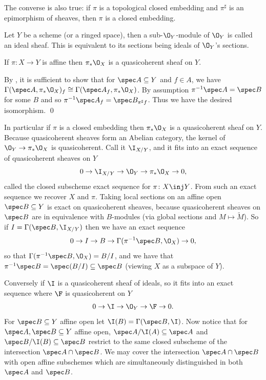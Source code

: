     The converse is also true: if $\pi$ is a topological closed embedding and $\pi^\sharp$ is an epimorphism of sheaves, then $\pi$ is a closed
    embedding.

\eremark

\bdefn

    Let $Y$ be a scheme (or a ringed space), then a sub-$\O_Y$-module of $\O_Y$ is called an {\emphcolor ideal sheaf}.
    This is equivalent to its sections being ideals of $\O_Y$'s sections.

\edefn

\blemm

    If $\pi\colon X\to Y$ is affine then $\pi_*\O_X$ is a quasicoherent sheaf on $Y$.

\elemm

\bproof

    By , it is sufficient to show that for $\spec A\subseteq Y$ and $f\in A$,
    we have $\Gamma(\spec A,\pi_*\O_X)_f\cong\Gamma(\spec A_f,\pi_*\O_X)$.
    By assumption $\pi^{-1}\spec A=\spec B$ for some $B$ and so $\pi^{-1}\spec A_f=\spec B_{\pi^\sharp f}$.
    Thus we have the desired isomorphism.
    \qed

\eproof

In particular if $\pi$ is a closed embedding then $\pi_*\O_X$ is a quasicoherent sheaf on $Y$.
Because quasicoherent sheaves form an Abelian category, the kernel of $\O_Y\to\pi_*\O_X$ is quasicoherent.
Call it $\I_{X/Y}$, and it fits into an exact sequence of quasicoherent sheaves on $Y$
$$ 0 \to \I_{X/Y} \to \O_Y \to \pi_*\O_X \to 0 , $$
called the {\emphcolor closed subscheme exact sequence} for $\pi\colon X\inj Y$.
From such an exact sequence we recover $X$ and $\pi$.
Taking local sections on an affine open $\spec B\subseteq Y$ is exact on quasicoherent sheaves, because quasicoherent sheaves on $\spec B$
are in equivalence with $B$-modules (via global sections and $M\mapsto\tilde M$).
So if $I=\Gamma(\spec B,\I_{X/Y})$ then we have an exact sequence
$$ 0 \to I \to B \to \Gamma(\pi^{-1}\spec B,\O_X) \to 0 , $$
so that $\Gamma(\pi^{-1}\spec B,\O_X)=B/I$, and we have that $\pi^{-1}\spec B=\spec(B/I)\subseteq\spec B$ (viewing $X$ as a subspace of $Y$).

Conversely if $\I$ is a quasicoherent sheaf of ideals, so it fits into an exact sequence where $\F$ is quasicoherent on $Y$
$$ 0 \to \I \to \O_Y \to \F \to 0 . $$
For $\spec B\subseteq Y$ affine open let $\I(B)=\Gamma(\spec B,\I)$.
Now notice that for $\spec A,\spec B\subseteq Y$ affine open, $\spec A/\I(A)\subseteq\spec A$ and $\spec B/\I(B)\subseteq\spec B$
restrict to the same closed subscheme of the intersection $\spec A\cap\spec B$.
We may cover the intersection $\spec A\cap\spec B$ with open affine subschemes which are simultaneously distinguished in both $\spec A$ and
$\spec B$.


